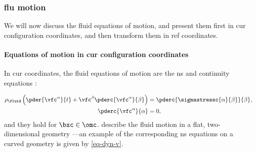 \subsubsection{\Acl{flu} motion}
\label{sec_fl_mem_flu}



We will now discuss the fluid equations of motion, and present them first in \ac{cur} configuration coordinates, and then transform them in \ac{ref} coordinates.


\paragraph{Equations of motion in  \acl{cur} configuration coordinates}
\label{sec_fl_mem_flu_cur}

In \ac{cur} coordinates, the fluid equations of motion are the \ac{ns} and continuity equations \cite{landauFluidMechanics1987}:

\begin{align}
    \label{eq_fl_rigid_fl_1_current}
    \rho_\fluid \left( \pder{\vfc^\alpha}{t} + \vfc^\beta  \pderc{\vfc^\alpha}{\beta} \right) & =  \pderc{  \sigmastressc{\alpha}{\beta}}{\beta} ,                                               \\
    \label{eq_fl_rigid_fl_2_current}
    \pderc{ \vfc^\alpha }{\alpha}                                                             & =                                                              0                               ,
\end{align}
and they hold for $\bxc \in \omc$.
\Cref{\eqsbfluc} describe the fluid motion in a flat, two-dimensional geometry \cite{landauFluidMechanics1987}---an example of the corresponding  \ac{ns} equations on a curved geometry is given by \cref{eq-dyn-v}.



